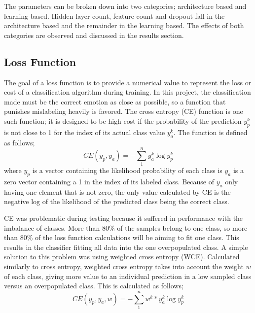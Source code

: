 	The parameters can be broken down into two categories; architecture based and learning based. Hidden layer count, feature count and dropout fall in the architecture based and the remainder in the learning based.  The effects of both categories are observed and discussed in the results section.
\subsection{Loss Function}
	The goal of a loss function is to provide a numerical value to represent the loss or cost of a classification algorithm during training. In this project, the classification made must be the correct emotion as close as possible, so a function that punishes mislabeling heavily is favored. The cross entropy (CE) function is one such function; it is designed to be high cost if the probability of the prediction $y_p^k$ is not close to 1 for the index of its actual class value $y_a^k$. The function is defined as follows;
	\begin{equation}
	CE(y_p,y_a) = - \sum_{1}^{n}y_a^k \log y_p^k
	\end{equation}
	where $y_p$ is a vector containing the likelihood probability of each class is $y_a$ is a zero vector containing a 1 in the index of its labeled class. Because of $y_a$ only having one element that is not zero, the only value calculated by CE is the negative log of the likelihood of the predicted class being the correct class.
	
	CE was problematic during testing because it suffered in performance with the imbalance of classes. More than 80\% of the samples belong to one class, so more than 80\% of the loss function calculations will be aiming to fit one class. This results in the classifier fitting all data into the one overpopulated class. A simple solution to this problem was using weighted cross entropy (WCE). Calculated similarly to cross entropy, weighted cross entropy takes into account the weight $w$ of each class, giving more value to an individual prediction in a low sampled class versus an overpopulated class. This is calculated as follows;
	\begin{equation}
	CE(y_p,y_a, w) = - \sum_{1}^{n}w^k * y_a^k \log y_p^k
	\end{equation}
	
	